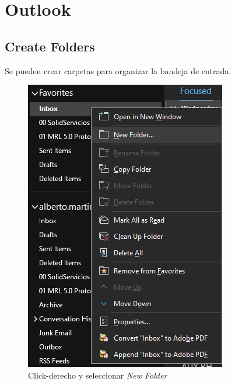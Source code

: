 \documentclass{report}
\begin{document}
\part{Outlook}

\chapter{Create Folders}

Se pueden crear carpetas para organizar la bandeja de entrada.

\begin{figure}[H]
	\centering
	\includegraphics[width=0.85\linewidth, height=0.5\textheight,keepaspectratio]{Imagenes/outlook_createfolders01}
	\caption{Click-derecho y seleccionar \emph{New Folder}}
	\label{fig:outlookcreatefolders01}
\end{figure}
\end{document}
